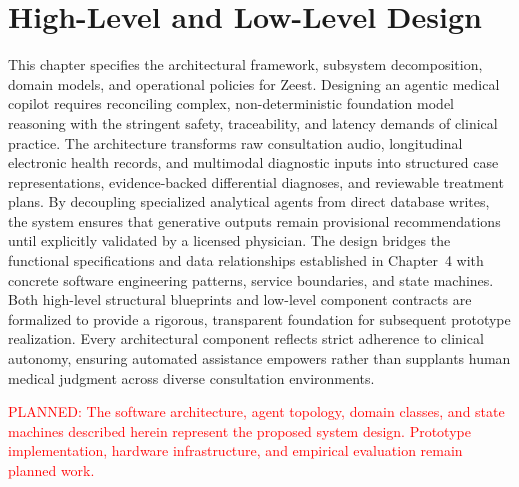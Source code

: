 \begingroup
\renewcommand{\encodingdefault}{T1}
\selectfont
\chapter{High-Level and Low-Level Design}
This chapter specifies the architectural framework, subsystem decomposition, domain models, and operational policies for Zeest. Designing an agentic medical copilot requires reconciling complex, non-deterministic foundation model reasoning with the stringent safety, traceability, and latency demands of clinical practice. The architecture transforms raw consultation audio, longitudinal electronic health records, and multimodal diagnostic inputs into structured case representations, evidence-backed differential diagnoses, and reviewable treatment plans. By decoupling specialized analytical agents from direct database writes, the system ensures that generative outputs remain provisional recommendations until explicitly validated by a licensed physician. The design bridges the functional specifications and data relationships established in Chapter~4 with concrete software engineering patterns, service boundaries, and state machines. Both high-level structural blueprints and low-level component contracts are formalized to provide a rigorous, transparent foundation for subsequent prototype realization. Every architectural component reflects strict adherence to clinical autonomy, ensuring automated assistance empowers rather than supplants human medical judgment across diverse consultation environments.

\textcolor{red}{PLANNED: The software architecture, agent topology, domain classes, and state machines described herein represent the proposed system design. Prototype implementation, hardware infrastructure, and empirical evaluation remain planned work.}

